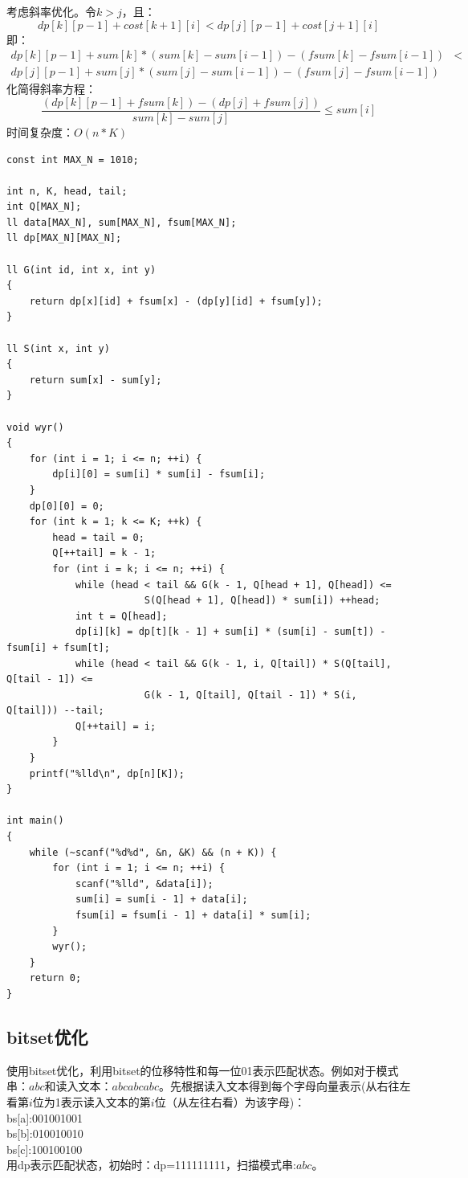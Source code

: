 考虑斜率优化。令$k>j$，且：
$$
dp[k][p-1]+cost[k+1][i] < dp[j][p-1]+cost[j+1][i]
$$
即：
$$
\begin{aligned}
dp[k][p-1]+sum[k]*(sum[k]-sum[i-1])-(fsum[k]-fsum[i-1])&< \\
dp[j][p-1]+sum[j]*(sum[j]-sum[i-1])-(fsum[j]-fsum[i-1])
\end{aligned}
$$
化简得斜率方程：
$$
\frac{(dp[k][p-1]+fsum[k])-(dp[j]+fsum[j])}{sum[k]-sum[j]}\leq sum[i]
$$
时间复杂度：$O(n*K)$
\begin{lstlisting}
const int MAX_N = 1010;

int n, K, head, tail;
int Q[MAX_N];
ll data[MAX_N], sum[MAX_N], fsum[MAX_N];
ll dp[MAX_N][MAX_N];

ll G(int id, int x, int y)
{
	return dp[x][id] + fsum[x] - (dp[y][id] + fsum[y]);
}

ll S(int x, int y)
{
	return sum[x] - sum[y];
}

void wyr()
{
	for (int i = 1; i <= n; ++i) {
		dp[i][0] = sum[i] * sum[i] - fsum[i];
	}
	dp[0][0] = 0;
	for (int k = 1; k <= K; ++k) {
		head = tail = 0;
		Q[++tail] = k - 1;
		for (int i = k; i <= n; ++i) {
			while (head < tail && G(k - 1, Q[head + 1], Q[head]) <=
						S(Q[head + 1], Q[head]) * sum[i]) ++head;
			int t = Q[head];
			dp[i][k] = dp[t][k - 1] + sum[i] * (sum[i] - sum[t]) - fsum[i] + fsum[t];
			while (head < tail && G(k - 1, i, Q[tail]) * S(Q[tail], Q[tail - 1]) <=
						G(k - 1, Q[tail], Q[tail - 1]) * S(i, Q[tail])) --tail;
			Q[++tail] = i;
		}
	}
	printf("%lld\n", dp[n][K]);
}

int main()
{
	while (~scanf("%d%d", &n, &K) && (n + K)) {
		for (int i = 1; i <= n; ++i) {
			scanf("%lld", &data[i]);
			sum[i] = sum[i - 1] + data[i];
			fsum[i] = fsum[i - 1] + data[i] * sum[i];
		}
		wyr();
	}
	return 0;
}
\end{lstlisting}

\subsection{bitset优化}
使用bitset优化，利用bitset的位移特性和每一位01表示匹配状态。例如对于模式串：$abc$和读入文本：$abcabcabc$。先根据读入文本得到每个字母向量表示(从右往左看第$i$位为1表示读入文本的第$i$位（从左往右看）为该字母)：\\
bs[a]:001001001 \\
bs[b]:010010010 \\
bs[c]:100100100 \\
用dp表示匹配状态，初始时：dp=111111111，扫描模式串:$abc$。 \\


